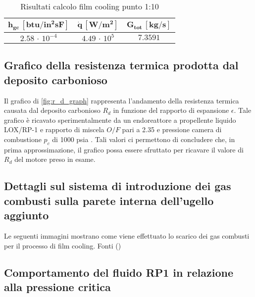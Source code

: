 \begin{table}[H]
\centering
\begin{tabular}{|c|c|c|}
\hline
$\bm{h_{gc} \, [btu/in^2 sF]}$ & $\bm{\dot{q} \, [W/m^2]}$ & $\bm{G_{tot} \, [kg/s]}$  \\
\hline
$2.58\, \cdot \, 10^{-4} $ & $4.49\, \cdot \, 10^5 $ & $  7.3591 $  \\
\hline
\end{tabular}
\caption{Risultati calcolo film cooling punto 1:10}
\label{table:tabella_film_out}
\end{table}



\subsection{Grafico della resistenza termica prodotta dal deposito carbonioso}
Il grafico di \autoref{fig:r_d_graph} rappresenta l'andamento della resistenza termica causata dal deposito carbonioso $R_d$ in funzione del rapporto di espansione $\epsilon$. Tale grafico è ricavato sperimentalmente da un endoreattore a propellente liquido LOX/RP-1 e rapporto di miscela $O/F$ pari a 2.35 e pressione camera di combustione $p_c$ di 1000 psia \cite{AIAA_book_2}. Tali valori ci permettono di concludere che, in prima approssimazione, il grafico possa essere sfruttato per ricavare il valore di $R_d$ del motore preso in esame. 


\subsection{Dettagli sul sistema di introduzione dei gas combusti sulla parete interna dell'ugello aggiunto}
Le seguenti immagini mostrano come viene effettuato lo scarico dei gas combusti per il processo di film cooling. Fonti (\cite{site_exhaust}\cite{f-1_manual})

\subsection{Comportamento del fluido RP1 in relazione alla pressione critica}

 
